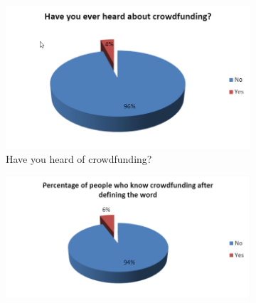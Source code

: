   


      
\begin{figure}
      \centering
      \begin{subfigure}[b]{0.45\textwidth}
          \centering
          \includegraphics[width=\textwidth]{assets/heardCrowd.png}
          \caption{Have you heard of crowdfunding?}
          \label{fig: heardCrowd}
      \end{subfigure}
      \hfill
      \begin{subfigure}[b]{0.45\textwidth}
          \centering
          \includegraphics[width=\textwidth]{assets/knowCrowd.png}

\end{subfigure}
\end{figure}
